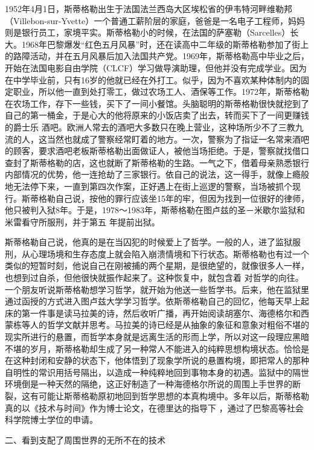 \documentclass{article}
\begin{document}
1952年4月1日，斯蒂格勒出生于法国法兰西岛大区埃松省的伊韦特河畔维勒邦（Villebon-sur-Yvette）一个普通工薪阶层的家庭，爸爸是一名电子工程师，妈妈则是银行员工，家境平实。斯蒂格勒小的时候，在法国的萨塞勒（Sarcelles）长大。1968年巴黎爆发“红色五月风暴”时，还在读高中二年级的斯蒂格勒参加了街上的路障活动，并在五月风暴后加入法国共产党。1969年，斯蒂格勒高中毕业之后，开始在法国电影自由学院（CLCF）学习做导演助理，但他并没有完成学业。因为在中学毕业前，只有16岁的他就已经在外打工。似乎，因为不喜欢某种体制内的固定职业，所以他一直到处打零工，做过农场工人、酒保等工作。1972年，斯蒂格勒在农场工作，存下一些钱，买下了一间小餐馆。头脑聪明的斯蒂格勒很快就挖到了自己的第一桶金，于是心大的他将原来的小饭店卖了出去，转而买下了一间更赚钱的爵士乐
\newpage
酒吧。欧洲人常去的酒吧大多数只在晚上营业，这种场所少不了三教九流的人，这当然也就成了警察经常盯着的地方。一次，警察为了指证一名常来酒吧的顾客，要求酒吧老板斯蒂格勒出面做证人，被他当场拒绝。于是，警察就找借口查封了斯蒂格勒的店，这也就断了斯蒂格勒的生路。一气之下，借着母亲熟悉银行内部情况的优势，他一连抢劫了三家银行。依自己的说法，这一得手，就像上瘾般地无法停下来，一直到第四次作案，正好遇上在街上巡逻的警察，当场被抓个现行。斯蒂格勒自己说，按他的罪行应该坐15年的牢，但因为找到一位很好的律师，他只被判入狱8年。于是，1978～1983年，斯蒂格勒在图卢兹的圣－米歇尔监狱和米雷看守所服刑，并于第五
年提前出狱。 

斯蒂格勒自己说，他真的是在当囚犯的时候爱上了哲学。一般的人，进了监狱服刑，从心理场境和生存态度上就会陷入崩溃情境和下行状态。斯蒂格勒也有过一个类似的短暂时刻，他说自己在刚被捕的两个星期，是很绝望的，就像很多人一样，也想到过自杀，但他很快就振作起来了。这种恢复中，就包含着
\newpage
对哲学的向往。一个朋友听说斯蒂格勒想学习哲学，就开始为他送一些哲学书。后来，他在监狱里通过函授的方式进入图卢兹大学学习哲学。依斯蒂格勒自己的回忆，他每天早上起床的第一件事是读马拉美的诗，然后收听广播，再开始阅读胡塞尔、海德格尔和西蒙栋等人的哲学文献并思考。马拉美的诗已经是从抽象的象征和意象对粗俗不堪的现实所进行的悬置，而哲学本身就是远离生活的形而上学，所以对这一段理应黑暗不堪的岁月，斯蒂格勒却生成了另一种常人不能进入的纯粹思想构境状态。恰恰是在这种封闭和安静的状态下，他体悟到了现象学所说的悬置构境，即把常人的那种自明性的常识用括号隔出，以造成一种纯粹地回到事物本身的初遇。监狱中的隔世环境倒是一种天然的隔绝，这正好制造了一种海德格尔所说的周围上手世界的断裂，这有可能让斯蒂格勒原初地回到哲学思想的本真构境中。多年以后，斯蒂格勒真的以《技术与时间》作为博士论文，在德里达的指导下
，通过了巴黎高等社会科学院博士学位的申请。 


二、看到支配了周围世界的无所不在的技术 
\end{document}
